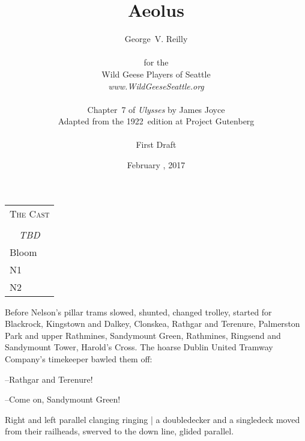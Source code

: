 


\title{\Huge Aeolus}
\author{George~V. Reilly\\
\\
{\small for the}\\
Wild Geese Players of Seattle\\
{\emph{www.WildGeeseSeattle.org}}\\
\\
{\small Chapter~7 of \emph{Ulysses} by James Joyce}\\
{\small Adapted from the 1922~edition at Project Gutenberg}
\\
\\
{\small First Draft}}
\date{February , 2017}
\raggedbottom



\maketitle
\thispagestyle{empty}
\pagebreak

\begin{tabular}{lp{10cm}}
    \multicolumn{2}{c}{\Large \textsc{The Cast}} \\
\\
    \multicolumn{2}{c}{\large \textit{TBD}} \\
Bloom \\
N1 \\
N2 \\
\end{tabular}

\thispagestyle{empty}
\newpage


\setcounter{page}{1}


Before Nelson's pillar trams slowed,
shunted,
changed trolley,
started for Blackrock,
Kingstown and Dalkey,
Clonskea,
Rathgar and Terenure,
Palmerston Park and upper Rathmines,
Sandymount Green,
Rathmines,
Ringsend and Sandymount Tower,
Harold's Cross.
The hoarse Dublin United Tramway Company's timekeeper bawled them off:

--Rathgar and Terenure!

--Come on, Sandymount Green!

Right and left parallel clanging ringing |
a doubledecker and a singledeck moved from their railheads,
swerved to the down line,
glided parallel.

